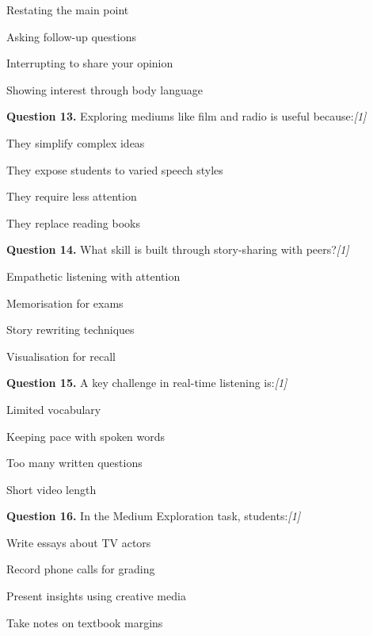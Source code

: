 \documentclass[11pt,a4paper]{article}
\newcommand{\pts}[1]{\hfill   \textit{[#1]}}
\begin{document}
\begin{parts}
  \item Restating the main point
  \item Asking follow-up questions
  \item Interrupting to share your opinion
  \item Showing interest through body language
\end{parts}

\medskip


\noindent   \textbf{Question 13.} Exploring mediums like film and radio is useful because:\pts{1}

\begin{parts}
  \item They simplify complex ideas
  \item They expose students to varied speech styles
  \item They require less attention
  \item They replace reading books
\end{parts}

\medskip


\noindent   \textbf{Question 14.} What skill is built through story-sharing with peers?\pts{1}

\begin{parts}
  \item Empathetic listening with attention
  \item Memorisation for exams
  \item Story rewriting techniques
  \item Visualisation for recall
\end{parts}

\medskip


\noindent   \textbf{Question 15.} A key challenge in real-time listening is:\pts{1}

\begin{parts}
  \item Limited vocabulary
  \item Keeping pace with spoken words
  \item Too many written questions
  \item Short video length
\end{parts}

\medskip


\noindent   \textbf{Question 16.} In the Medium Exploration task, students:\pts{1}

\begin{parts}
  \item Write essays about TV actors
  \item Record phone calls for grading
  \item Present insights using creative media
  \item Take notes on textbook margins
\end{parts}
\end{document}
